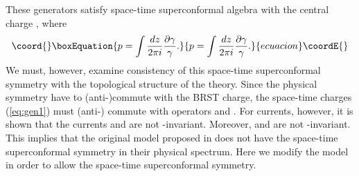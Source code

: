 \documentclass[a4paper,12pt]{article}
\begin{document}
These generators satisfy \coordHE{} space-time superconformal algebra with
the central charge \coordHE{}, where
\begin{equation}\coord{}\boxEquation{
 p=\int {d z\over 2\pi i}{\partial \gamma\over \gamma}. 
}{
 p=\int {d z\over 2\pi i}{\partial \gamma\over \gamma}. 
}{ecuacion}\coordE{}\end{equation}
We must, however, examine consistency of this space-time \coordHE{}
 superconformal symmetry with the topological
\coordHE{} structure of the theory. 
Since the physical symmetry
have to (anti-)commute with the BRST charge, the space-time
charges (\ref{eq:gen1}) must (anti-) commute with operators
\coordHE{} and
\coordHE{}.
For \coordHE{} currents, however,
it is shown that the currents \coordHE{} and \coordHE{} are not
\coordHE{}-invariant.
Moreover, \coordHE{} and \coordHE{} are not
\coordHE{}-invariant.
This implies that the original model proposed in \cite{GKP}
does not have the space-time superconformal symmetry
in their physical spectrum.
Here we modify the model in order to allow the space-time
superconformal symmetry.
\end{document}
